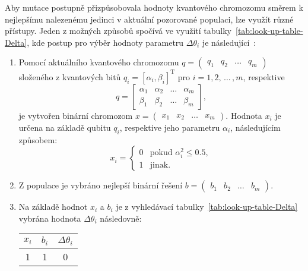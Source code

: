 Aby mutace postupně přizpůsobovala hodnoty kvantového chromozomu směrem k nejlepšímu nalezenému jedinci v aktuální pozorované populaci, lze využít různé přístupy. 
Jeden z možných způsobů spočívá ve využití tabulky~\ref{tab:look-up-table-Delta}, kde postup pro výběr hodnoty parametru $\Delta\theta_i$ je následující~\cite{NaturalComputing}:
\begin{enumerate}
    \item Pomocí aktuálního kvantového chromozomu $q = \begin{pmatrix} q_1 & q_2 & \dots & q_m \end{pmatrix}$ složeného z kvantových bitů $ q_i = \left[ \alpha_i, \beta_i \right]^\text{T}$ pro $i=1,2,\,\dots\,,m$, respektive
        \begin{equation*}
            q =
            \begin{bmatrix}
                \alpha_1 & \alpha_2 & \dots & \alpha_m \\
                \beta_1  & \beta_2  & \dots & \beta_m
            \end{bmatrix},
        \end{equation*}
        je vytvořen binární chromozom $x = \begin{pmatrix} x_1 & x_2 & \dots & x_m \end{pmatrix}$.
        Hodnota $x_i$ je určena na základě qubitu $q_i$, respektive jeho parametru $\alpha_i$, následujícím způsobem:
        \begin{equation*}
            x_i =
            \begin{cases} 
                0 & \text{pokud } \alpha_i^2 \leq 0.5, \\
                1 & \text{jinak}.
            \end{cases}
        \end{equation*}
    \item Z populace je vybráno nejlepší binární řešení $b = \begin{pmatrix} b_1 & b_2 & \dots & b_m \end{pmatrix}$.
    \item Na základě hodnot $x_i$ a $b_i$ je z vyhledávací tabulky~\ref{tab:look-up-table-Delta} vybrána hodnota $\Delta\theta_i$ následovně:
        \begin{table}[ht!]
            \centering
            \begin{tabular}{|c c|c|}
            \hline
            $x_i$ & $b_i$ & $\Delta\theta_i$ \\
            \hline
            1     & 1     & 0                \\ 

\end{tabular}
\end{table}
\end{enumerate}
